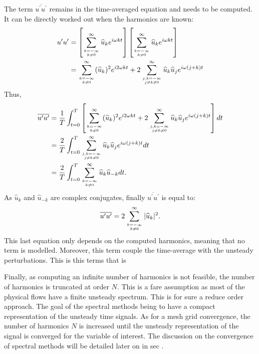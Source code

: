 The term $\overline{u^\prime u^\prime}$ remains in the time-averaged
equation and needs to be computed. It can be 
directly worked out when the harmonics are known:
\begin{equation}
	\begin{split}
		u^\prime u^\prime &= 
		\left[
			\sum_{k=-\infty \atop k \neq 0}^{\infty} \widehat{u}_k e^{i \omega k t} 
		\right]
		\left[
			\sum_{k=-\infty \atop k \neq 0}^{\infty} \widehat{u}_k e^{i \omega k t} 
		\right] \\
		&= \sum_{k=-\infty \atop k \neq 0}^{\infty} (\widehat{u}_k)^2
		   e^{i 2 \omega k t} +
		   2 \sum_{j,k=-\infty \atop j \neq k \neq 0}^{\infty} 
		   \widehat{u}_k \widehat{u}_j e^{i \omega (j + k) t} \\
	\end{split}
\end{equation}
Thus,
\begin{equation}
	\begin{split}
		\overline{u^\prime u^\prime} &= 
		\frac{1}{T} \int_{t=0}^{T} \left[ 
			\sum_{k=-\infty \atop k \neq 0}^{\infty} (\widehat{u}_k)^2
		   	e^{i 2 \omega k t} +
		   	2 \sum_{j,k=-\infty \atop j \neq k \neq 0}^{\infty} 
		   	\widehat{u}_k \widehat{u}_j e^{i \omega (j + k) t} 
		\right] dt\\
		&= \frac{2}{T} \int_{t=0}^{T} \sum_{j,k=-\infty \atop j \neq k \neq 0}^{\infty} 
		   	\widehat{u}_k \widehat{u}_j 
		   	e^{i \omega (j + k) t} dt \\
		&= \frac{2}{T} \int_{t=0}^{T} 
			\sum_{k=-\infty \atop k \neq 0}^{\infty} 
			\widehat{u}_k \widehat{u}_{-k}  dt.
	\end{split}
\end{equation}
As $\widehat{u}_k$ and $\widehat{u}_{-k}$ are complex conjugates,
finally $\overline{u^\prime u^\prime}$ is equal to:
\begin{equation}
	\overline{u^\prime u^\prime} = 
	2 \sum_{k=-\infty \atop k \neq 0}^{\infty} |\widehat{u}_k|^2.
	\label{eq:sm_nlh_deterministic_stress_terms}
\end{equation}
This last equation only depends on the computed harmonics, meaning
that no term is modelled. Moreover, this term couple the
time-average with the unsteady perturbations. This is this
terms that is 

Finally, as computing an infinite number of harmonics is not feasible,
the number of harmonics is truncated at order $N$. 
This is a fare assumption as most
of the physical flows have a finite unsteady spectrum. This
is for sure a reduce order approach. The goal of the spectral
methods being to have a compact representation of the unsteady time
signals. As for a mesh grid convergence, the number of harmonics $N$
is increased until the unsteady representation of the signal is
converged for the variable of interest. The discussion on the
convergence of spectral methods will be detailed later on in sec
.


